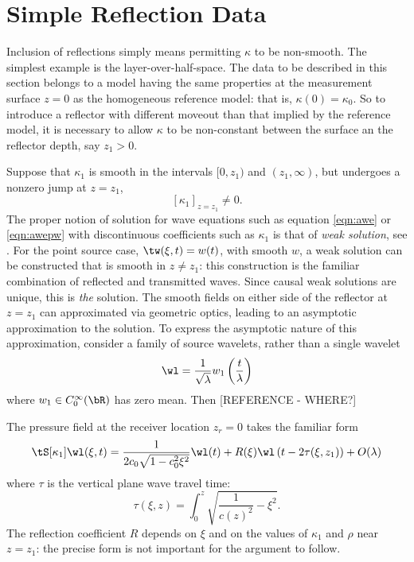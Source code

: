 
\section{Simple Reflection Data}

Inclusion of reflections simply means permitting $\kappa$ to be
non-smooth. The simplest example is the layer-over-half-space. The
data to be described in this section belongs to a model having the
same properties at the measurement surface $z=0$ as the homogeneous
reference model: that is, $\kappa(0)=\kappa_0$. So to introduce a
reflector with different moveout than that implied by the reference
model, it is necessary to allow $\kappa$ to be non-constant between
the surface an the reflector depth, say $z_1 > 0$. 

Suppose that $\kappa_1$ is smooth in the intervals $[0,z_1)$ and
$(z_1,\infty)$, but undergoes a nonzero jump at $z=z_1$, 
\[
[\kappa_1]_{z=z_1} \ne 0.
\]
The proper notion of solution for wave equations such as equation
\ref{eqn:awe} or \ref{eqn:awepw} with discontinuous coefficients such
as $\kappa_1$ is that of {\em weak solution}, see
\cite{BlazekStolkSymes:13}. For the point source case, $\tw(\xi,t) =
w(t)$, with smooth $w$, a weak solution can be constructed that is
smooth in $z \ne z_1$: this construction is the familiar combination
of reflected and transmitted waves. Since causal weak solutions are
unique, this is {\em the} solution. The smooth fields on either side
of the reflector at $z=z_1$ can approximated via geometric optics,
leading to an asymptotic
approximation to the solution. To express the asymptotic nature of
this approximation, consider a family of source wavelets, rather than
a single wavelet
\[
\wl = \frac{1}{\sqrt{\lambda}}w_1\left(\frac{t}{\lambda}\right)
\]
where $w_1\in C_0^{\infty}(\bR)$ has zero mean. Then [REFERENCE - WHERE?]

The pressure field at the receiver 
location $z_r=0$ takes the familiar form  
\begin{equation}
\label{eqn:modlohs}
\tS[\kappa_1]\wl(\xi,t) = \frac{1}{2c_0\sqrt{1-c_0^2\xi^2}}\wl(t) +
R(\xi)\wl\left(t-2\tau(\xi,z_1)\right) + O(\lambda)
\end{equation}
where $\tau$ is the vertical plane wave travel time:
\begin{equation}
\label{eqn:pwtt}
\tau(\xi,z) = \int_0^{z} \sqrt{\frac{1}{c(z)^2}-\xi^2}.
\end{equation}
The reflection coefficient $R$ depends on $\xi$ and on
the values of $\kappa_1$ and $\rho$ near $z=z_1$: the precise form is not
important for the argument to follow.

